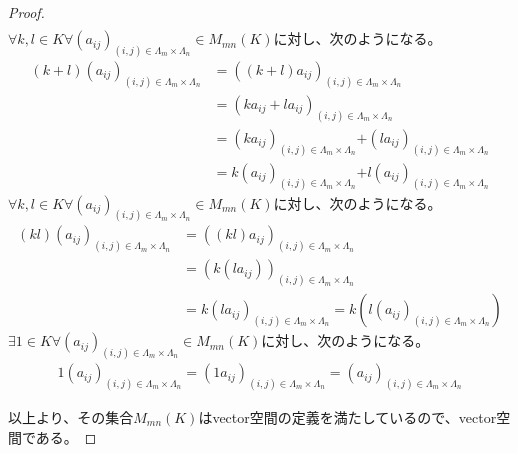 \documentclass[dvipdfmx]{jsarticle}
\begin{document}
\begin{proof}
\begin{align*}
\end{align*}
$\forall k,l \in K\forall\left( a_{ij} \right)_{(i,j) \in \varLambda_{m} \times \varLambda_{n}} \in M_{mn}(K)$に対し、次のようになる。
\begin{align*}
(k + l)\left( a_{ij} \right)_{(i,j) \in \varLambda_{m} \times \varLambda_{n}} &= \left( (k + l)a_{ij} \right)_{(i,j) \in \varLambda_{m} \times \varLambda_{n}}\\
&= \left( ka_{ij} + la_{ij} \right)_{(i,j) \in \varLambda_{m} \times \varLambda_{n}}\\
&= \left( ka_{ij} \right)_{(i,j) \in \varLambda_{m} \times \varLambda_{n}}\mathbf{+}\left( la_{ij} \right)_{(i,j) \in \varLambda_{m} \times \varLambda_{n}}\\
&= k\left( a_{ij} \right)_{(i,j) \in \varLambda_{m} \times \varLambda_{n}}\mathbf{+}l\left( a_{ij} \right)_{(i,j) \in \varLambda_{m} \times \varLambda_{n}}
\end{align*}
$\forall k,l \in K\forall\left( a_{ij} \right)_{(i,j) \in \varLambda_{m} \times \varLambda_{n}} \in M_{mn}(K)$に対し、次のようになる。
\begin{align*}
(kl)\left( a_{ij} \right)_{(i,j) \in \varLambda_{m} \times \varLambda_{n}} &= \left( (kl)a_{ij} \right)_{(i,j) \in \varLambda_{m} \times \varLambda_{n}}\\
&= \left( k\left( la_{ij} \right) \right)_{(i,j) \in \varLambda_{m} \times \varLambda_{n}}\\
&= {k\left( la_{ij} \right)}_{(i,j) \in \varLambda_{m} \times \varLambda_{n}} = k\left( l\left( a_{ij} \right)_{(i,j) \in \varLambda_{m} \times \varLambda_{n}} \right)
\end{align*}
$\exists 1 \in K\forall\left( a_{ij} \right)_{(i,j) \in \varLambda_{m} \times \varLambda_{n}} \in M_{mn}(K)$に対し、次のようになる。
\begin{align*}
1\left( a_{ij} \right)_{(i,j) \in \varLambda_{m} \times \varLambda_{n}} = \left( 1a_{ij} \right)_{(i,j) \in \varLambda_{m} \times \varLambda_{n}} = \left( a_{ij} \right)_{(i,j) \in \varLambda_{m} \times \varLambda_{n}}
\end{align*}\par
以上より、その集合$M_{mn}(K)$はvector空間の定義を満たしているので、vector空間である。
\end{proof}
\end{document}
